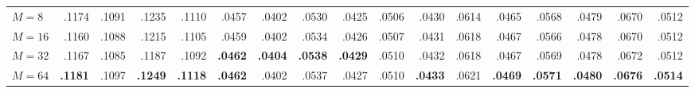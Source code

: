 ﻿\documentclass[sigconf,anonymous,review]{acmart}
\begin{document}
\begin{table}[!tbp]
{\begin{tabular}{l*{4}{rrrr}}
$M=8$ & .1174 & .1091 & .1235 & .1110 & .0457 & .0402 & .0530 & .0425 & .0506 & .0430 & .0614 & .0465 & .0568 & .0479 & .0670 & .0512 \\
$M=16$ & .1160 & .1088 & .1215 & .1105 & .0459 & .0402 & .0534 & .0426 & .0507 & .0431 & .0618 & .0467 & .0566 & .0478 & .0670 & .0512 \\
$M=32$ & .1167 & .1085 & .1187 & .1092 & \textbf{.0462} & \textbf{.0404} & \textbf{.0538} & \textbf{.0429} & .0510 & .0432 & .0618 & .0467 & .0569 & .0478 & .0672 & .0512 \\
$M=64$ & \textbf{.1181} & .1097 & \textbf{.1249} & \textbf{.1118} & \textbf{.0462} & .0402 & .0537 & .0427 & .0510 & \textbf{.0433} & .0621 & \textbf{.0469} & \textbf{.0571} & \textbf{.0480} & \textbf{.0676} & \textbf{.0514} \\

\end{tabular}}
\end{table}
\end{document}
